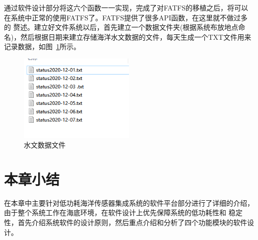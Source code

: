 通过软件设计部分将这六个函数一一实现，完成了对FATFS的移植之后，将可以在系统中正常的使用FATFS了。FATFS提供了很多API函数，在这里就不做过多的
赘述。建立好文件系统以后，首先建立一个数据文件夹(根据系统布放地点命名)，然后根据日期来建立存储海洋水文数据的文件，每天生成一个TXT文件用来记录数据，如图~\ref{fig:水文数据文件}所示。
\begin{figure}[ht]
    \centering
	\includegraphics[width=0.5\textwidth]{fig/水文数据文件.png}
	\caption{水文数据文件}
	\label{fig:水文数据文件}
\end{figure}

\section{本章小结}
在本章中主要针对低功耗海洋传感器集成系统的软件平台部分进行了详细的介绍，由于整个系统工作在海底环境，在软件设计上优先保障系统的低功耗性和 稳定性，首先介绍系统软件的设计原则，然后重点介绍和分析了四个功能模块的软件设计。